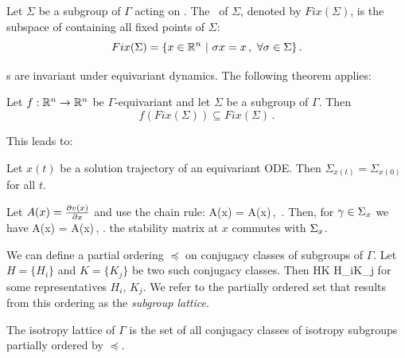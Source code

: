 \begin{definition}
 \label{def:fixedsp}
  Let $\Sigma$ be a subgroup of $\Gamma$ acting on . The \fixedsp\ of $\Sigma$,
 denoted by $Fix(\Sigma)$, is the subspace of  containing all fixed points of $\Sigma$:
\[
	Fix(\Sigma)=\{x\in\mathbb{R}^{n}\ |\ \sigma x = x\,,\ \forall \sigma\in\Sigma\}\,.
\]
\end{definition}

\Fixedsp s are invariant under equivariant dynamics. The following theorem applies:

\begin{theorem}
 Let $f:\mathbb{R}^{n}\rightarrow\mathbb{R}^{n}$ be $\Gamma$-equivariant and let $\Sigma$ be a subgroup of $\Gamma$. Then
\[
 f\left(Fix(\Sigma)\right)\subseteq Fix(\Sigma)\,.
\]
\end{theorem}

This leads to:
\begin{proposition}
 Let $x(t)$ be a solution trajectory of an equivariant ODE. Then $\Sigma_{x(t)}=\Sigma_{x(0)}$ for all $t$.
\label{pro:gfInv}
\end{proposition}

Let $A(x)=\frac{\partial v(x)}{\partial x}$ and use the chain rule:
\beq
	A(\gamma x) \gamma = \gamma A(x)\,, \qquad \gamma\in\Gamma\,.
	\label{eq:LrzGroupOrb}
\eeq
Then, for $\gamma\in\Sigma_{x}$ we have
\beq
	A(x) \gamma = \gamma A(x)\,, \qquad \gamma\in{}.
	\label{eq:LrzCommut}
\eeq
\ie the stability matrix at $x$ commutes with $\Sigma_{x}$.

We can define a partial ordering $\preceq$ on conjugacy classes of subgroups of $\Gamma$. Let $H=\{H_i\}$ and $K=\{K_j\}$
be two such conjugacy classes. Then
\beq
	H\preceq K \Leftrightarrow H_i\subseteq K_j
	\label{eq:Gorder}
\eeq
for some representatives $H_i,\,K_j$. We refer to the partially ordered set that results from this ordering as the \emph{subgroup lattice}.

\begin{definition}
 The isotropy lattice of $\Gamma$ is the set of all conjugacy classes of isotropy subgroups
 partially ordered by $\preceq$.
\end{definition}

